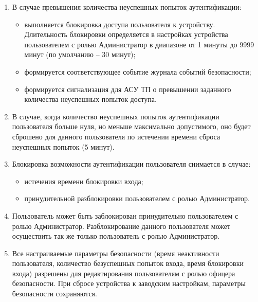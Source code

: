 \begin{enumerate}[label=\arabic{section}.\arabic{subsection}.\arabic*, labelsep=4pt, leftmargin=0pt, itemindent=57pt]
\begin{enumerate}[label=\arabic{section}.\arabic{subsection}.\arabic{enumi}.\arabic*, labelsep=4pt, leftmargin=0em, itemindent=65pt, parsep=0pt]
\item
В случае превышения количества неуспешных попыток аутентификации:
\begin{itemize}
    \item выполняется блокировка доступа пользователя к устройству. Длительность блокировки определяется в настройках устройства пользователем с ролью Администратор в диапазоне от 1 минуты до 9999 минут (по умолчанию – 30 минут);
    \item формируется соответствующее событие журнала событий безопасности;
    \item формируется сигнализация для АСУ ТП о превышении заданного количества неуспешных попыток доступа. 
\end{itemize}

\item
В случае, когда количество неуспешных попыток аутентификации пользователя больше нуля, но меньше максимально допустимого, оно будет сброшено для данного пользователя по истечении времени сброса неуспешных попыток (5 минут).

\item
Блокировка возможности аутентификации пользователя снимается в случае:
\begin{itemize}
    \item истечения времени блокировки входа;
    \item принудительной разблокировки пользователем с ролью Администратор. 
\end{itemize}

\item
Пользователь может быть заблокирован принудительно пользователем с ролью Администратор. Разблокирование данного пользователя может осуществить так же только пользователь с ролью Администратор.

\item
Все настраиваемые параметры безопасности (время неактивности пользователя, количество безуспешных попыток входа, время блокировки входа) разрешены для редактирования пользователям с ролью офицера безопасности. При сбросе устройства к заводским настройкам, параметры безопасности сохраняются.



\end{enumerate}
\end{enumerate}
